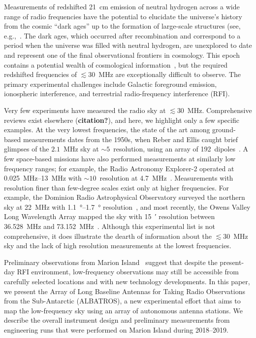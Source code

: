 \documentclass{ws-jai}
\def\albatros{ALBATROS}
\begin{document}
Measurements of redshifted \SI{21}{\cm} emission of neutral hydrogen
across a wide range of radio frequencies have the potential to
elucidate the universe's history from the cosmic ``dark ages'' up to
the formation of large-scale structures (see,
e.g.,~\citep{ska_physics,2013PhRvD..87d3002L,2014ApJ...782...66P}.
The dark ages, which occurred after recombination and correspond to a
period when the universe was filled with neutral hydrogen, are
unexplored to date and represent one of the final observational
frontiers in cosmology.  This epoch contains a potential wealth of
cosmological information~\citep{loeb_zaldarriaga, 2019arXiv190710853C,
  2019arXiv190804296K}, but the required redshifted frequencies of
$\lesssim 30$~MHz are exceptionally difficult to observe.  The primary
experimental challenges include Galactic foreground emission,
ionospheric interference, and terrestrial radio-frequency interference
(RFI).

Very few experiments have measured the radio sky at $\lesssim 30$~MHz.
Comprehensive reviews exist elsewhere ({\bf citation?}), and here, we
highlight only a few specific examples.  At the very lowest
frequencies, the state of the art among ground-based measurements
dates from the 1950s, when Reber and Ellis caught brief glimpses of
the $2.1$~MHz sky at $\sim 5$\degree\ resolution, using an array of
192~dipoles~\citep{reber, article, 1988A&A...195..372W}.  A few
space-based missions have also performed measurements at similarly low
frequency ranges; for example, the Radio Astronomy Explorer-2 operated
at \SIrange{0.025}{13}{\MHz} with $\sim 10$\degree\ resolution at
\SI{4.7}{\MHz}~\citep{1975A&A....40..365A}.  Measurements with
resolution finer than few-degree scales exist only at higher
frequencies.  For example, the Dominion Radio Astrophysical
Observatory surveyed the northern sky at \SI{22}{\MHz} with
\SIrange{1.1}{1.7}{\degree} resolution~\citep{1999A&AS..137....7R},
and most recently, the Owens Valley Long Wavelength Array mapped the
sky with \SI{15}{\arcminute} resolution between 36.528~MHz and
73.152~MHz~\citep{2018AJ....156...32E}.  Although this experimental
list is not comprehensive, it does illustrate the dearth of
information about the $\lesssim 30$~MHz sky and the lack of high
resolution measurements at the lowest frequencies.

Preliminary observations from Marion
Island~\citep{2019JAI.....850004P} suggest that despite the
present-day RFI environment, low-frequency observations may still be
accessible from carefully selected locations and with new technology
developments.  In this paper, we present the Array of Long Baseline
Antennas for Taking Radio Observations from the Sub-Antarctic
(\albatros), a new experimental effort that aims to map the
low-frequency sky using an array of autonomous antenna stations.  We
describe the overall instrument design and preliminary measurements
from engineering runs that were performed on Marion Island during
2018--2019.
\end{document}
